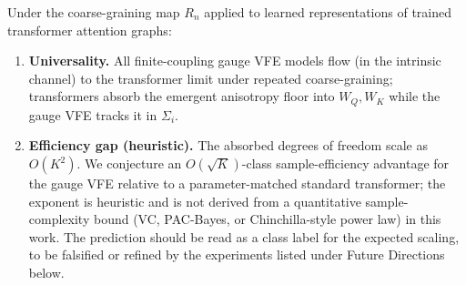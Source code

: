 \documentclass[twoside,11pt]{article}
\begin{document}
\begin{conjecture}
\label{conj:rg_universality}
Under the coarse-graining map $R_n$ applied to learned representations of trained transformer attention graphs:
\begin{enumerate}
\item[(a)] \textbf{Universality.} All finite-coupling gauge VFE models flow (in the intrinsic channel) to the transformer limit under repeated coarse-graining; transformers absorb the emergent anisotropy floor into $W_Q, W_K$ while the gauge VFE tracks it in $\Sigma_i$.
\item[(b)] \textbf{Efficiency gap (heuristic).} The absorbed degrees of freedom scale as $O(K^2)$. We conjecture an $O(\sqrt{K})$-class sample-efficiency advantage for the gauge VFE relative to a parameter-matched standard transformer; the exponent is heuristic and is not derived from a quantitative sample-complexity bound (VC, PAC-Bayes, or Chinchilla-style power law) in this work. The prediction should be read as a class label for the expected scaling, to be falsified or refined by the experiments listed under Future Directions below.
\end{enumerate}
\end{conjecture}
\end{document}

